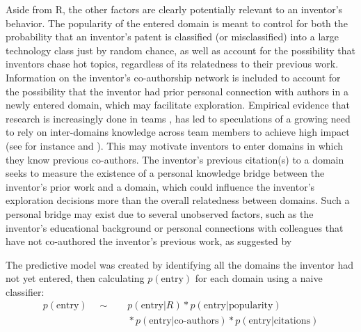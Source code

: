 \documentclass{dsj}
\begin{document}
Aside from R, the other factors are clearly potentially relevant to an inventor’s behavior. The popularity of the entered domain is meant to control for both the probability that an inventor’s patent is classified (or misclassified) into a large technology class just by random chance, as well as account for the possibility that inventors chase hot topics, regardless of its relatedness to their previous work. Information on the inventor’s co-authorship network is included to account for the possibility that the inventor had prior personal connection with authors in a newly entered domain, which may facilitate exploration. Empirical evidence that research is increasingly done in teams \cite{Wuchty2007}, has led to speculations of a growing need to rely on inter-domains knowledge across team members to achieve high impact (see for instance \cite{Borner2010} and \cite{Fiore2008}). This may motivate inventors to enter domains in which they know previous co-authors. The inventor’s previous citation(s) to a domain seeks to measure the existence of a personal knowledge bridge between the inventor’s prior work and a domain, which could influence the inventor’s exploration decisions more than the overall relatedness between domains. Such a personal bridge may exist due to several unobserved factors, such as the inventor’s educational background or personal connections with colleagues that have not co-authored the inventor’s previous work, as suggested by \cite{White2004}

The predictive model was created by identifying all the domains the inventor had not yet entered, then calculating $p(\text{entry})$ for each domain using a naive classifier:
\begin{align}
p(\text{entry}) \quad \sim & \quad  p(\text{entry}|R) * p(\text{entry}|\text{popularity})  \nonumber\\
&\quad * p(\text{entry}|\text{co-authors}) * p(\text{entry}|\text{citations})
\end{align}
\end{document}
